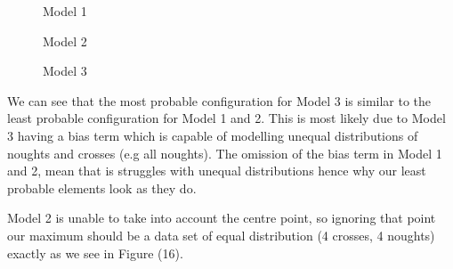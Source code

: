 \documentclass[10pt, a4paper, twocolumn]{article} %
\begin{document}
\begin{enumerate}
\begin{figure}[H]%
    \centering
    \qquad
    \caption{Model 1}%
    \label{fig:example}%
\end{figure}
\begin{figure}[H]%
    \centering
    \qquad
    \caption{Model 2}%
    \label{fig:example}%
\end{figure}
\begin{figure}[H]%
    \centering
    \qquad
    \caption{Model 3}%
    \label{fig:example}%
\end{figure}

We can see that the most probable configuration for Model 3 is similar to the least probable configuration for Model 1 and 2. This is most likely due to Model 3 having a bias term which is capable of modelling unequal distributions of noughts and crosses (e.g all noughts). The omission of the bias term in Model 1 and 2, mean that is struggles with unequal distributions hence why our least probable elements look as they do.

Model 2 is unable to take into account the centre point, so ignoring that point our maximum should be a data set of equal distribution (4 crosses, 4 noughts) exactly as we see in Figure (16).


\end{enumerate}
\end{document}
